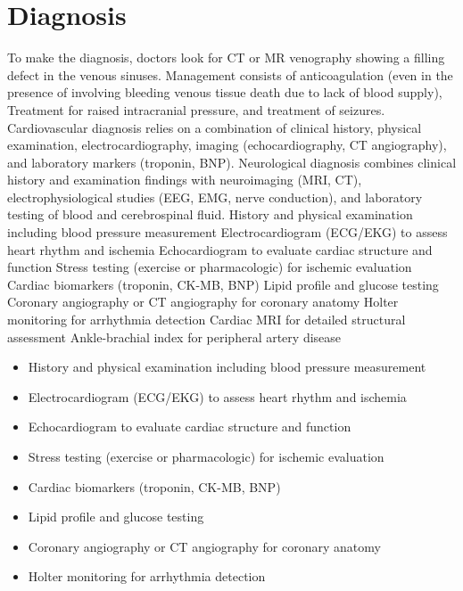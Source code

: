 \section{Diagnosis}
To make the diagnosis, doctors look for CT or MR venography showing a filling defect in the venous sinuses. Management consists of anticoagulation (even in the presence of involving bleeding venous tissue death due to lack of blood supply), Treatment for raised intracranial pressure, and treatment of seizures. Cardiovascular diagnosis relies on a combination of clinical history, physical examination, electrocardiography, imaging (echocardiography, CT angiography), and laboratory markers (troponin, BNP). Neurological diagnosis combines clinical history and examination findings with neuroimaging (MRI, CT), electrophysiological studies (EEG, EMG, nerve conduction), and laboratory testing of blood and cerebrospinal fluid. History and physical examination including blood pressure measurement Electrocardiogram (ECG/EKG) to assess heart rhythm and ischemia Echocardiogram to evaluate cardiac structure and function Stress testing (exercise or pharmacologic) for ischemic evaluation Cardiac biomarkers (troponin, CK-MB, BNP) Lipid profile and glucose testing Coronary angiography or CT angiography for coronary anatomy Holter monitoring for arrhythmia detection Cardiac MRI for detailed structural assessment Ankle-brachial index for peripheral artery disease

\begin{itemize}[noitemsep]
  \item History and physical examination including blood pressure measurement
  \item Electrocardiogram (ECG/EKG) to assess heart rhythm and ischemia
  \item Echocardiogram to evaluate cardiac structure and function
  \item Stress testing (exercise or pharmacologic) for ischemic evaluation
  \item Cardiac biomarkers (troponin, CK-MB, BNP)
  \item Lipid profile and glucose testing
  \item Coronary angiography or CT angiography for coronary anatomy
  \item Holter monitoring for arrhythmia detection
\end{itemize}
